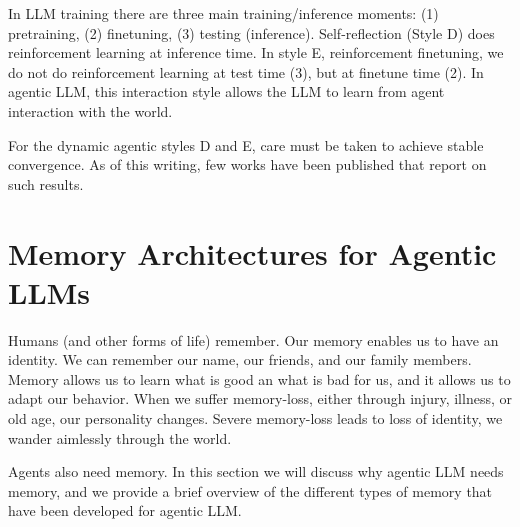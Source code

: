 In LLM training there are three main training/inference moments: (1) pretraining, (2) finetuning, (3) testing (inference).  Self-reflection (Style D) does reinforcement learning at inference time.
%
In style E, reinforcement finetuning, we do not do reinforcement learning at test time (3), but  at finetune time (2). %
%
%
In agentic LLM, this interaction style allows the LLM to learn from agent interaction with the world. 

For the dynamic agentic styles D and E, care must be taken to achieve stable convergence. As of this writing, few works have been published that report on such results. 

\section{Memory Architectures for Agentic LLMs}\label{sec:memory}
Humans (and other forms of life) remember. Our memory enables us to have an identity. We can remember our name, our friends, and our family members. Memory allows us to learn what is good an what is bad for us, and it allows us to adapt our behavior. 
When we suffer memory-loss, either through injury, illness, or old age, our personality changes. Severe memory-loss leads to loss of identity, we wander aimlessly through the world.

Agents also need memory. In this section we will discuss why agentic LLM needs memory, and we provide a brief overview of the different types of memory that have been developed for agentic LLM.


